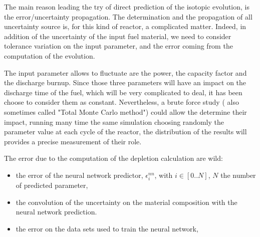 \documentclass[dvips,12pt]{article}
\begin{document}
The main reason leading the try of direct prediction of the isotopic evolution, is the error/uncertainty propagation.
The determination and the propagation of all uncertainty source is, for this kind of reactor, a complicated matter. Indeed, in addition of the uncertainty of the input fuel material, we need to consider tolerance variation on the input parameter, and the error coming from the computation of the evolution.

The input parameter allows to fluctuate are the power, the capacity factor and the discharge burnup. Since those three parameters will have an impact on the discharge time of the fuel, which will be very complicated to deal, it has been choose to consider them as constant. 
Nevertheless, a brute force study ( also sometimes called "Total Monte Carlo method") could allow the determine their impact, running many time the same simulation choosing randomly the parameter value at each cycle of the reactor, the distribution of the results will provides a precise measurement of their role.

The error due to the computation of the depletion calculation are wild:
\begin{itemize}
\item the error of the neural network predictor, $\epsilon^{nn}_{i}$, with $i\in[0..N]$, $N$ the number of predicted parameter, 
\item the convolution of the uncertainty on the material composition with the neural network prediction. 
\item the error on the data sets used to train the neural network,
\end{itemize}
\end{document}
